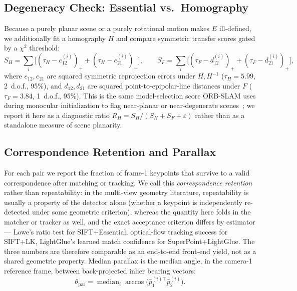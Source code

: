 \documentclass[11pt,a4paper]{article}
\begin{document}
\subsection{Degeneracy Check: Essential vs.\ Homography}
Because a purely planar scene or a purely rotational motion makes $E$
ill-defined, we additionally fit a homography $H$ and compare symmetric
transfer scores gated by a $\chi^2$ threshold:
\begin{equation}
  S_H = \sum_i \bigl[(\tau_H - e_{12}^{(i)})_+
                    + (\tau_H - e_{21}^{(i)})_+\bigr],
  \qquad
  S_F = \sum_i \bigl[(\tau_F - d_{12}^{(i)})_+
                    + (\tau_F - d_{21}^{(i)})_+\bigr],
\end{equation}
where $e_{12}, e_{21}$ are squared symmetric reprojection errors under
$H, H^{-1}$ ($\tau_H = 5.99$, 2~d.o.f., 95\%), and $d_{12}, d_{21}$
are squared point-to-epipolar-line distances under $F$
($\tau_F = 3.84$, 1~d.o.f., 95\%). This is the same model-selection
score ORB-SLAM uses during monocular initialization to flag
near-planar or near-degenerate scenes~\cite{orbslam}; we report it
here as a diagnostic ratio $R_H = S_H / (S_H + S_F + \varepsilon)$
rather than as a standalone measure of scene planarity.

\subsection{Correspondence Retention and Parallax}
For each pair we report the fraction of frame-1 keypoints that survive
to a valid correspondence after matching or tracking. We call this
\emph{correspondence retention} rather than repeatability: in the
multi-view geometry literature, repeatability is usually a property of
the detector alone (whether a keypoint is independently re-detected
under some geometric criterion), whereas the quantity here folds in
the matcher or tracker as well, and the exact acceptance criterion
differs by estimator --- Lowe's ratio test for SIFT+Essential,
optical-flow tracking success for SIFT+LK, LightGlue's learned match
confidence for SuperPoint+LightGlue. The three numbers are therefore
comparable as an end-to-end front-end yield, not as a shared
geometric property. Median parallax is the median angle, in the camera-1 reference frame,
between back-projected inlier bearing vectors:
\begin{equation}
  \theta_{\mathrm{par}}
    = \operatorname{median}_i
      \arccos\!\bigl(\hat{p}_1^{(i)\top}\hat{p}_2^{(i)}\bigr).
\end{equation}
\end{document}
